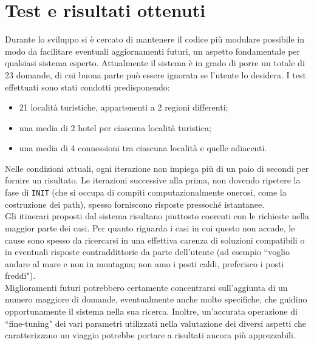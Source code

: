 \section{Test e risultati ottenuti}

Durante lo sviluppo si è cercato di mantenere il codice più modulare possibile in modo da facilitare eventuali aggiornamenti futuri, un aspetto fondamentale per qualsiasi sistema esperto.
Attualmente il sistema è in grado di porre un totale di 23 domande, di cui buona parte può essere ignorata se l'utente lo desidera.
I test effettuati sono stati condotti predisponendo:
\begin{itemize}
\item 21 località turistiche, appartenenti a 2 regioni differenti;
\item una media di 2 hotel per ciascuna località turistica;
\item una media di 4 connessioni tra ciascuna località e quelle adiacenti.
\end{itemize}
Nelle condizioni attuali, ogni iterazione non impiega più di un paio di secondi per fornire un risultato. Le iterazioni successive alla prima, non dovendo ripetere la fase di \texttt{INIT} (che si occupa di compiti computazionalmente onerosi, come la costruzione dei path), spesso forniscono risposte pressoché istantanee.\\
Gli itinerari proposti dal sistema risultano piuttosto coerenti con le richieste nella maggior parte dei casi. Per quanto riguarda i casi in cui questo non accade, le cause sono spesso da ricercarsi in una effettiva carenza di soluzioni compatibili o in eventuali risposte contraddittorie da parte dell'utente (ad esempio ``voglio andare al mare e non in montagna; non amo i posti caldi, preferisco i posti freddi"). \\
Miglioramenti futuri potrebbero certamente concentrarsi sull'aggiunta di un numero maggiore di domande, eventualmente anche molto specifiche, che guidino opportunamente il sistema nella sua ricerca. Inoltre, un'accurata operazione di ``fine-tuning" dei vari parametri utilizzati nella valutazione dei diversi aspetti che caratterizzano un viaggio potrebbe portare a risultati ancora più apprezzabili.









